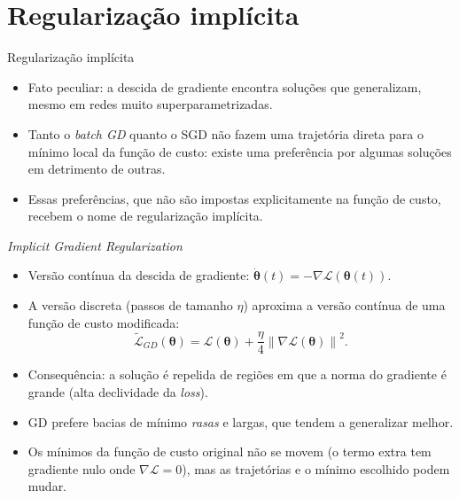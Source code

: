 \documentclass[aspectratio=169,xcolor=dvipsnames]{beamer}
\begin{document}
  \section{Regularização implícita}

  \begin{frame}{Regularização implícita}
    \begin{itemize}
      \item Fato peculiar: a descida de gradiente encontra soluções que
        \alert{generalizam}, mesmo em redes muito superparametrizadas.
      \item Tanto o \textit{batch GD} quanto o SGD não fazem uma trajetória
        direta para o mínimo local da função de custo: existe uma preferência
        por algumas soluções em detrimento de outras.
      \item Essas preferências, que não são impostas explicitamente na
        função de custo, recebem o nome de \alert{regularização implícita}.
    \end{itemize}
  \end{frame}

  \begin{frame}{\textit{Implicit Gradient Regularization}}
    \begin{itemize}
      \item Versão contínua da descida de gradiente:
        $\dot{\bm{\theta}}(t) = -\nabla \mathcal{L}(\bm{\theta}(t))$.
      \item A versão discreta (passos de tamanho $\eta$) aproxima a versão contínua
        de uma função de custo \alert{modificada}:
        $$\tilde{\mathcal{L}}_{GD}(\bm{\theta}) = \mathcal{L}(\bm{\theta})
          + \frac{\eta}{4} \left\| \nabla \mathcal{L}(\bm{\theta}) \right\|^2.$$
      \item Consequência: a solução é \alert{repelida} de regiões em que a norma
        do gradiente é grande (alta declividade da \textit{loss}).
      \item GD prefere bacias de mínimo \textit{rasas} e largas, que tendem
        a generalizar melhor.
      \item Os mínimos da função de custo original não se movem (o termo extra
        tem gradiente nulo onde $\nabla \mathcal{L} = 0$), mas as trajetórias
        e o mínimo escolhido podem mudar.
    \end{itemize}
  \end{frame}
\end{document}
